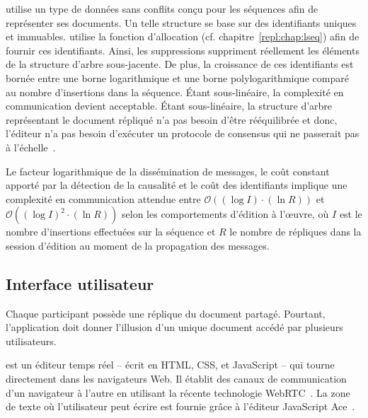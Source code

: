 \CRATE utilise un type de données sans conflits conçu pour les
séquences afin de représenter ses documents. Un telle structure se base sur des
identifiants uniques et immuables. \CRATE utilise la fonction d'allocation \LSEQ
(cf. chapitre~\ref{repl:chap:lseq}) afin de fournir ces identifiants. Ainsi, les
suppressions suppriment réellement les éléments de la structure d'arbre
sous-jacente. De plus, la croissance de ces identifiants est bornée entre une
borne logarithmique et une borne polylogarithmique comparé au nombre
d'insertions dans la séquence. Étant sous-linéaire, la complexité en
communication devient acceptable. Étant sous-linéaire, la structure d'arbre
représentant le document répliqué n'a pas besoin d'être rééquilibrée et donc,
l'éditeur n'a pas besoin d'exécuter un protocole de consensus qui ne passerait
pas à l'échelle~\cite{mostefaoui2015signature}.

Le facteur logarithmique de la dissémination de messages, le coût constant
apporté par la détection de la causalité et le coût des identifiants implique
une complexité en communication attendue entre
$\mathcal{O}((\log I)\cdot (\ln R))$ et $\mathcal{O}((\log I)^2\cdot(\ln R))$
selon les comportements d'édition à l'œuvre, où $I$ est le nombre d'insertions
effectuées sur la séquence et $R$ le nombre de répliques dans la session
d'édition au moment de la propagation des messages.


\subsection{Interface utilisateur}

Chaque participant possède une réplique du document partagé. Pourtant,
l'application doit donner l'illusion d'un unique document accédé par plusieurs
utilisateurs.

\CRATE est un éditeur temps réel -- écrit en HTML, CSS, et JavaScript -- qui
tourne directement dans les navigateurs Web. Il établit des canaux de
communication d'un navigateur à l'autre en utilisant la récente technologie
WebRTC~\cite{webrtc}. La zone de texte où l'utilisateur peut écrire est fournie
grâce à l'éditeur JavaScript Ace~\cite{ace}.



